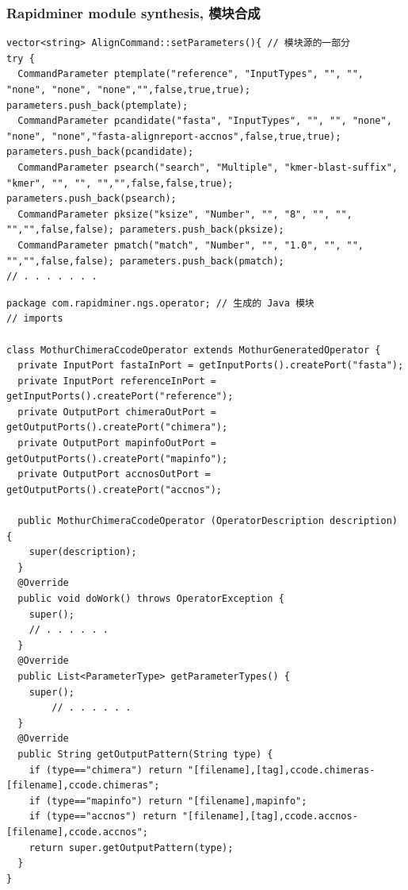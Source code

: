 \documentclass[10pt]{beamer}
\begin{document}
\begin{frame}[fragile]
  \frametitle{Rapidminer module synthesis, 模块合成}
\begin{verbatim}
vector<string> AlignCommand::setParameters(){ // 模块源的一部分
try {
  CommandParameter ptemplate("reference", "InputTypes", "", "", "none", "none", "none","",false,true,true); parameters.push_back(ptemplate);
  CommandParameter pcandidate("fasta", "InputTypes", "", "", "none", "none", "none","fasta-alignreport-accnos",false,true,true); parameters.push_back(pcandidate);
  CommandParameter psearch("search", "Multiple", "kmer-blast-suffix", "kmer", "", "", "","",false,false,true); parameters.push_back(psearch);
  CommandParameter pksize("ksize", "Number", "", "8", "", "", "","",false,false); parameters.push_back(pksize);
  CommandParameter pmatch("match", "Number", "", "1.0", "", "", "","",false,false); parameters.push_back(pmatch);
// . . . . . . .
\end{verbatim}
\begin{verbatim}
package com.rapidminer.ngs.operator; // 生成的 Java 模块
// imports

class MothurChimeraCcodeOperator extends MothurGeneratedOperator {
  private InputPort fastaInPort = getInputPorts().createPort("fasta");
  private InputPort referenceInPort = getInputPorts().createPort("reference");
  private OutputPort chimeraOutPort = getOutputPorts().createPort("chimera");
  private OutputPort mapinfoOutPort = getOutputPorts().createPort("mapinfo");
  private OutputPort accnosOutPort = getOutputPorts().createPort("accnos");

  public MothurChimeraCcodeOperator (OperatorDescription description) {
    super(description);
  }
  @Override
  public void doWork() throws OperatorException {
    super();
    // . . . . . .
  }
  @Override
  public List<ParameterType> getParameterTypes() {
    super();
        // . . . . . .
  }
  @Override
  public String getOutputPattern(String type) {
    if (type=="chimera") return "[filename],[tag],ccode.chimeras-[filename],ccode.chimeras";
    if (type=="mapinfo") return "[filename],mapinfo";
    if (type=="accnos") return "[filename],[tag],ccode.accnos-[filename],ccode.accnos";
    return super.getOutputPattern(type);
  }
}
\end{verbatim}
\end{frame}
\end{document}
